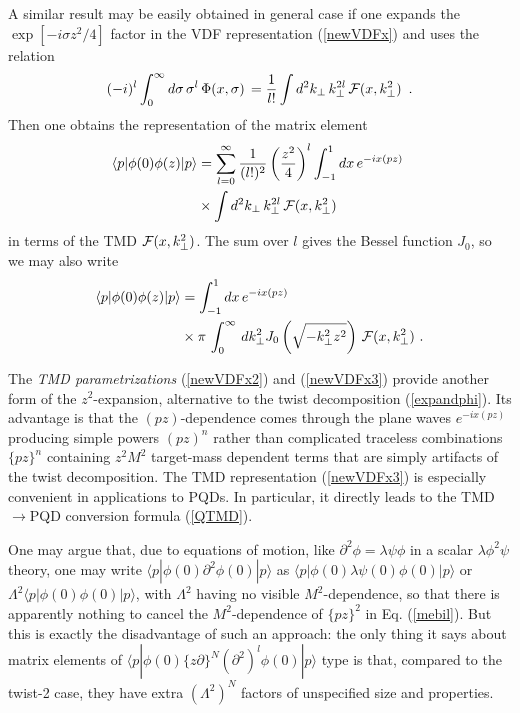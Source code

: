 \documentclass[final,5p,times,twocolumn]{elsarticle}
\newcommand{\nn}{\nonumber \\ }
\begin{document}
A similar  result may be easily obtained in general  case 
if one expands the $\exp [- i\sigma z^2 /4]$ factor in the VDF representation
(\ref{newVDFx})  and uses the relation 
 \begin{align}  
(-i)^l
 \int_{0}^{\infty}  {d \sigma }  \, {\sigma}^l  \, 
 \Phi (x,\sigma) \,=  \frac1{l!}
 \int  d^2 k_\perp   \,k_\perp^{2l} \,   {\cal F } (x, k_\perp ^2) \, 
  \ .
  \label{sigma_k} 
\end{align}
Then one obtains the representation of the matrix  element
 \begin{align}
  \langle p |   \phi(0) \phi (z)|p \rangle & =  \sum_{l=0}^\infty \frac1{(l!)^2} 
\left(   \frac{z^2  }{4} \right )^l 
  \int_{-1}^1 dx\,  e^{-i x (pz)} \,   \,  \nn &  \times 
  \int  d^2 k_\perp \,  %
   k_\perp^{2l}  \,   {\cal F } (x, k_\perp^2 )  
 \label{newVDFx2}
\end{align} 
in terms of the TMD $ {\cal F } (x, k_\perp^2 )$.  The sum over $l$ 
gives the Bessel function $J_0$, so we may also write
 \begin{align}
  \langle p |   \phi(0) \phi (z)|p \rangle & = 
  \int_{-1}^1 dx\,  e^{-i x (pz)}   \nn &  \times 
\pi \,   \int_{0}^{\infty} \, d k_\perp^2   %
  J_0 \left ( \sqrt{ -  k_\perp^{2} z^2} \right )   \,  {\cal F } (x, k_\perp^2 )  \  . 
 \label{newVDFx3}
\end{align} 

The {\it TMD parametrizations}  (\ref{newVDFx2}) and  (\ref{newVDFx3}) provide another form 
of the \mbox{$z^2$-expansion,}  alternative to the twist decomposition  (\ref{expandphi}). 
Its advantage is that the $(pz)$-dependence comes through the plane waves 
$e^{-ix (pz)}$ producing simple powers $(pz)^n$  rather than complicated
traceless combinations $\{pz\}^n$ containing   $z^2 M^2$ target-mass 
dependent terms   that are simply  artifacts of the twist decomposition.   The TMD representation (\ref{newVDFx3})  
is especially convenient in applications to PQDs. In particular,  it directly leads 
to the TMD$\to$PQD conversion formula (\ref{QTMD}). 

One may argue that, due to   equations of motion, like \mbox{$\partial^2 \phi = \lambda \psi \phi$} 
in a scalar $\lambda \phi^2 \psi$ theory, one may write $ \langle p |  \phi (0)  \partial^2  \phi( 0)|p \rangle$ as $
\langle p |  \phi (0)  \lambda \psi (0)   \phi( 0)|p \rangle$ or  $\Lambda^2 \langle p |  \phi (0)  \phi( 0)|p \rangle$,
with $\Lambda^2$ having no visible   $M^2$-dependence, so that there is apparently 
nothing to cancel the  $M^2$-dependence 
of $\{pz \}^2$  in Eq. (\ref{mebil}). But this is exactly the  disadvantage 
of such an  approach:  the only thing it says about  matrix elements
of $\langle p |  \phi(0)  \{z{\partial} \}^{N}  ({\partial}^2)^l  \phi(0) |p \rangle  $ type is that,
compared to  the  twist-2 case,  
they have    extra $(\Lambda^2)^N$ factors of unspecified  size and properties.   
\end{document}
